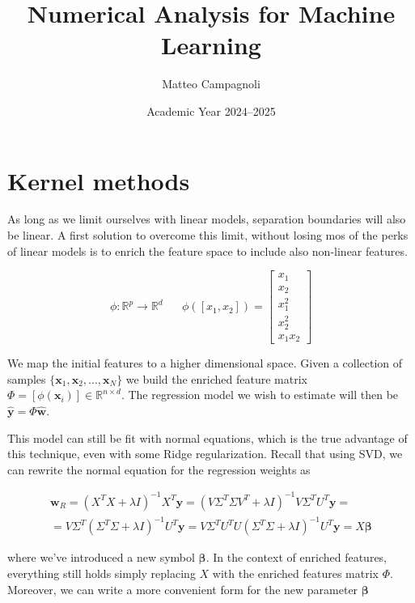 \documentclass{article}
\title{Numerical Analysis for Machine Learning}
\author{Matteo Campagnoli}
\date{Academic Year 2024--2025}
\numberwithin{equation}{subsection}
\begin{document}
\maketitle
\tableofcontents

\newpage

\section{Kernel methods}
As long as we limit ourselves with linear models, separation boundaries will also be linear. A first solution to overcome this limit, without losing mos of the perks of linear models is to enrich the feature space to include also non-linear features.

\begin{equation*}
    \phi : \mathbb{R}^p \to \mathbb{R}^d \;\;\;\;\;\; \phi([x_1,x_2]) = \begin{bmatrix}
    x_1 \\
    x_2 \\
    x_1^2 \\
    x_2^2 \\
    x_1 x_2
    \end{bmatrix}
\end{equation*}

We map the initial features to a higher dimensional space. Given a collection of samples $\{\textbf{x}_1,\textbf{x}_2,...,\textbf{x}_N\}$ we build the enriched feature matrix $\Phi = [\phi(\textbf{x}_i)] \in \mathbb{R}^{n \times d}$. The regression model we wish to estimate will then be $\hat{\textbf{y}} = \Phi \hat{\textbf{w}}$. 

This model can still be fit with normal equations, which is the true advantage of this technique, even with some Ridge regularization. Recall that using SVD, we can rewrite the normal equation for the regression weights as

\begin{gather*}
    \textbf{w}_R = (X^TX+\lambda I)^{-1}X^T \textbf{y} = (V \Sigma^T \Sigma V^T + \lambda I)^{-1} V \Sigma^T U^T \textbf{y} = \\
    = V \Sigma^T (\Sigma^T \Sigma + \lambda I)^{-1} U^T \textbf{y} = V \Sigma^T U^T U (\Sigma^T \Sigma + \lambda I)^{-1} U^T \textbf{y} = X \boldsymbol{\beta}
\end{gather*}

where we've introduced a new symbol $\boldsymbol{\beta}$. In the context of enriched features, everything still holds simply replacing $X$ with the enriched features matrix $\Phi$. Moreover, we can write a more convenient form for the new parameter $\boldsymbol{\beta}$
\end{document}
